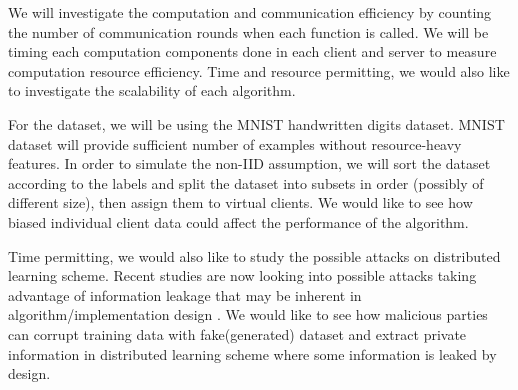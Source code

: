 \documentclass[12pt]{article}
\begin{document}
	\vspace{3mm}
	
	\noindent We will investigate the computation and communication efficiency by counting the number of communication rounds when each function is called. We will be timing each computation components done in each client and server to measure computation resource efficiency. Time and resource permitting, we would also like to investigate the scalability of each algorithm.
	
	\vspace{3mm}
	
	\noindent For the dataset, we will be using the MNIST handwritten digits dataset. MNIST dataset will provide sufficient number of examples without resource-heavy features. In order to simulate the non-IID assumption, we will sort the dataset according to the labels and split the dataset into subsets in order (possibly of different size), then assign them to virtual clients. We would like to see how biased individual client data could affect the performance of the algorithm.
	
	\vspace{3mm}
	
	\noindent Time permitting, we would also like to study the possible attacks on distributed learning scheme. Recent studies are now looking into possible attacks taking advantage of information leakage that may be inherent in algorithm/implementation design \cite{reducingleak}. We would like to see how malicious parties can corrupt training data with fake(generated) dataset and extract private information in distributed learning scheme where some information is leaked by design.

	
	
	
	
\end{document}
